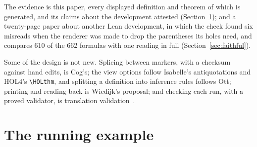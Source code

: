 \documentclass[acmsmall,screen,review,anonymous,nonacm]{acmart}
\begin{document}
\noindent The evidence is this paper, every displayed definition and
theorem of which is generated, and its claims about the development
attested (Section~\ref{sec:example}); and a twenty-page paper about
another Lean development, in which the check found six misreads when the
renderer was made to drop the parentheses its holes need, and compares
610 of the 662 formulas with one reading in full
(Section~\ref{sec:faithful}).

Some of the design is not new. Splicing between markers, with a checksum
against hand edits, is Cog's; the view options follow Isabelle's
antiquotations and HOL4's \verb|\HOLthm|, and splitting a definition into
inference rules follows Ott; printing and reading back is Wiedijk's
proposal; and checking each run, with a proved validator, is translation
validation~\cite{Pnueli98,Tristan08}.

\section{The running example}\label{sec:example}
\end{document}
